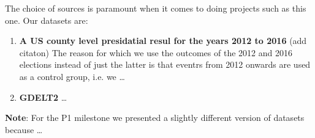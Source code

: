 The choice of sources is paramount when it comes to doing projects
such as this one. Our datasets are:
\begin{enumerate}
	\item \textbf{A US county level presidatial resul for the
		years 2012 to 2016}
		{\color{red}(add citaton)}
		The reason for which we use the outcomes
		of the 2012 and 2016 elections instead of just the latter
		is that eventrs from 2012 onwards are used as a
		control group, i.e. we \ldots

	\item \textbf{GDELT2} \ldots
\end{enumerate}

\textbf{Note}: For the P1 milestone we presented a slightly
different version of datasets because \ldots
